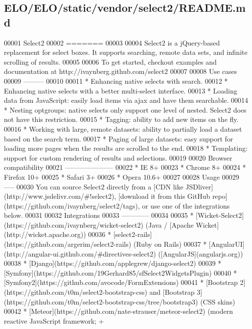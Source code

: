\hypertarget{ELO_2ELO_2static_2vendor_2select2_2README_8md_source}{}\subsection{E\+L\+O/\+E\+L\+O/static/vendor/select2/\+R\+E\+A\+D\+M\+E.md}

\begin{DoxyCode}
00001 Select2
00002 =======
00003 
00004 Select2 is a jQuery-based replacement for select boxes. It supports searching, remote data sets, and
       infinite scrolling of results.
00005 
00006 To get started, checkout examples and documentation at http://ivaynberg.github.com/select2
00007 
00008 Use cases
00009 ---------
00010 
00011 * Enhancing native selects with search.
00012 * Enhancing native selects with a better multi-select interface.
00013 * Loading data from JavaScript: easily load items via ajax and have them searchable.
00014 * Nesting optgroups: native selects only support one level of nested. Select2 does not have this
       restriction.
00015 * Tagging: ability to add new items on the fly.
00016 * Working with large, remote datasets: ability to partially load a dataset based on the search term.
00017 * Paging of large datasets: easy support for loading more pages when the results are scrolled to the
       end.
00018 * Templating: support for custom rendering of results and selections.
00019 
00020 Browser compatibility
00021 ---------------------
00022 * IE 8+
00023 * Chrome 8+
00024 * Firefox 10+
00025 * Safari 3+
00026 * Opera 10.6+
00027  
00028 Usage
00029 -----
00030 You can source Select2 directly from a [CDN like JSDliver](http://www.jsdelivr.com/#!select2),
       [download it from this GitHub repo](https://github.com/ivaynberg/select2/tags), or use one of the integrations
       below.
00031 
00032 Integrations
00033 ------------
00034 
00035 * [Wicket-Select2](https://github.com/ivaynberg/wicket-select2) (Java / [Apache
       Wicket](http://wicket.apache.org))
00036 * [select2-rails](https://github.com/argerim/select2-rails) (Ruby on Rails)
00037 * [AngularUI](http://angular-ui.github.com/#directives-select2) ([AngularJS](angularjs.org))
00038 * [Django](https://github.com/applegrew/django-select2)
00039 * [Symfony](https://github.com/19Gerhard85/sfSelect2WidgetsPlugin)
00040 * [Symfony2](https://github.com/avocode/FormExtensions)
00041 * [Bootstrap 2](https://github.com/t0m/select2-bootstrap-css) and [Bootstrap
       3](https://github.com/t0m/select2-bootstrap-css/tree/bootstrap3) (CSS skins)
00042 * [Meteor](https://github.com/nate-strauser/meteor-select2) (modern reactive JavaScript framework; +

\end{DoxyCode}
